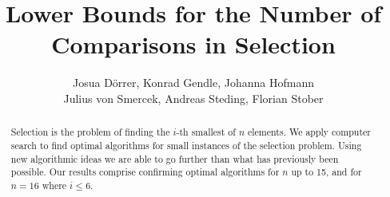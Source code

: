 \documentclass[twoside,leqno,twocolumn]{article}
\begin{document}
%
\newcommand\relatedversion{}



\title{\Large Lower Bounds for the Number of Comparisons in Selection\relatedversion}

\author{Josua Dörrer, Konrad Gendle, Johanna Hofmann \\ Julius von Smercek, Andreas Steding, Florian Stober}

\date{}

\maketitle







\begin{abstract} \small\baselineskip=9pt
  Selection is the problem of finding the $i$-th smallest of $n$ elements.
  We apply computer search to find optimal algorithms for small instances of the selection problem.
  Using new algorithmic ideas we are able to go further than what has previously been possible.
  Our results comprise confirming optimal algorithms for $n$ up to 15, and for $n=16$ where $i \le 6$.
  
\end{abstract} %
\end{document}
